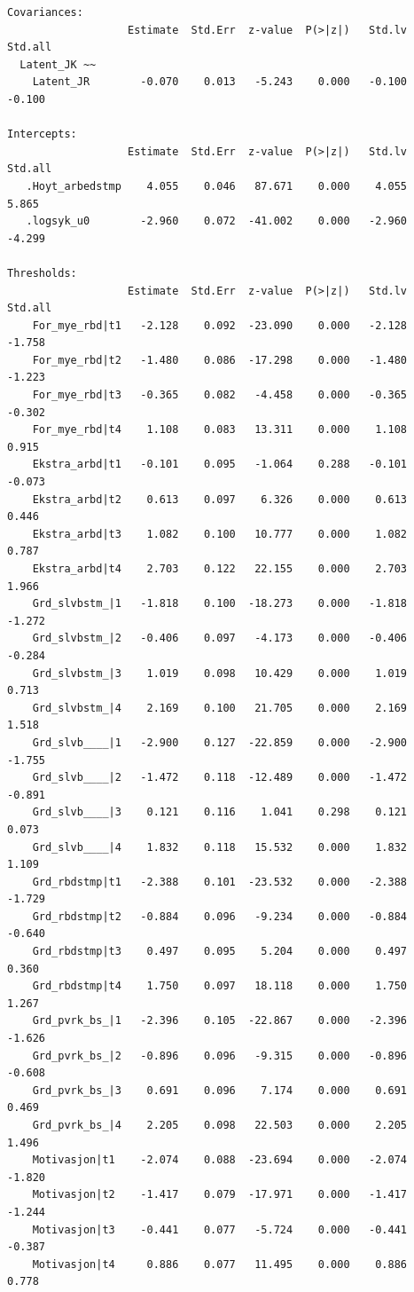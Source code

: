 \documentclass[
  12pt,
  a4paper,
  DIV=11,
  numbers=noendperiod]{scrartcl}
\begin{document}
\begin{verbatim}
Covariances:
                   Estimate  Std.Err  z-value  P(>|z|)   Std.lv  Std.all
  Latent_JK ~~                                                          
    Latent_JR        -0.070    0.013   -5.243    0.000   -0.100   -0.100

Intercepts:
                   Estimate  Std.Err  z-value  P(>|z|)   Std.lv  Std.all
   .Hoyt_arbedstmp    4.055    0.046   87.671    0.000    4.055    5.865
   .logsyk_u0        -2.960    0.072  -41.002    0.000   -2.960   -4.299

Thresholds:
                   Estimate  Std.Err  z-value  P(>|z|)   Std.lv  Std.all
    For_mye_rbd|t1   -2.128    0.092  -23.090    0.000   -2.128   -1.758
    For_mye_rbd|t2   -1.480    0.086  -17.298    0.000   -1.480   -1.223
    For_mye_rbd|t3   -0.365    0.082   -4.458    0.000   -0.365   -0.302
    For_mye_rbd|t4    1.108    0.083   13.311    0.000    1.108    0.915
    Ekstra_arbd|t1   -0.101    0.095   -1.064    0.288   -0.101   -0.073
    Ekstra_arbd|t2    0.613    0.097    6.326    0.000    0.613    0.446
    Ekstra_arbd|t3    1.082    0.100   10.777    0.000    1.082    0.787
    Ekstra_arbd|t4    2.703    0.122   22.155    0.000    2.703    1.966
    Grd_slvbstm_|1   -1.818    0.100  -18.273    0.000   -1.818   -1.272
    Grd_slvbstm_|2   -0.406    0.097   -4.173    0.000   -0.406   -0.284
    Grd_slvbstm_|3    1.019    0.098   10.429    0.000    1.019    0.713
    Grd_slvbstm_|4    2.169    0.100   21.705    0.000    2.169    1.518
    Grd_slvb____|1   -2.900    0.127  -22.859    0.000   -2.900   -1.755
    Grd_slvb____|2   -1.472    0.118  -12.489    0.000   -1.472   -0.891
    Grd_slvb____|3    0.121    0.116    1.041    0.298    0.121    0.073
    Grd_slvb____|4    1.832    0.118   15.532    0.000    1.832    1.109
    Grd_rbdstmp|t1   -2.388    0.101  -23.532    0.000   -2.388   -1.729
    Grd_rbdstmp|t2   -0.884    0.096   -9.234    0.000   -0.884   -0.640
    Grd_rbdstmp|t3    0.497    0.095    5.204    0.000    0.497    0.360
    Grd_rbdstmp|t4    1.750    0.097   18.118    0.000    1.750    1.267
    Grd_pvrk_bs_|1   -2.396    0.105  -22.867    0.000   -2.396   -1.626
    Grd_pvrk_bs_|2   -0.896    0.096   -9.315    0.000   -0.896   -0.608
    Grd_pvrk_bs_|3    0.691    0.096    7.174    0.000    0.691    0.469
    Grd_pvrk_bs_|4    2.205    0.098   22.503    0.000    2.205    1.496
    Motivasjon|t1    -2.074    0.088  -23.694    0.000   -2.074   -1.820
    Motivasjon|t2    -1.417    0.079  -17.971    0.000   -1.417   -1.244
    Motivasjon|t3    -0.441    0.077   -5.724    0.000   -0.441   -0.387
    Motivasjon|t4     0.886    0.077   11.495    0.000    0.886    0.778


\end{verbatim}
\end{document}
